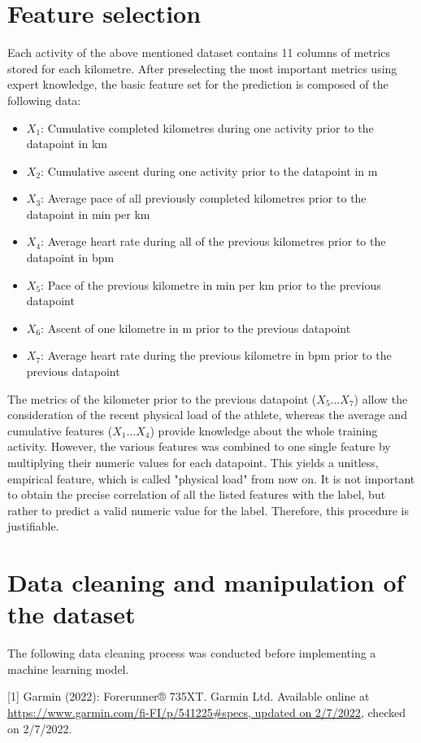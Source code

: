 \documentclass[11pt]{article}
\begin{document}
\section{Feature selection}
Each activity of the above mentioned dataset contains 11 columns of metrics stored for each kilometre. After preselecting the most important metrics using expert knowledge, the basic feature set for the prediction is composed of the following data:
\begin{itemize}
  \itemsep0pt
  \item ${X_1}$: Cumulative completed kilometres during one activity prior to the datapoint in km
  \item ${X_2}$: Cumulative ascent during one activity prior to the datapoint in m
  \item ${X_3}$: Average pace of all previously completed kilometres prior to the datapoint in min per km
  \item ${X_4}$: Average heart rate during all of the previous kilometres prior to the datapoint in bpm
  \item ${X_5}$: Pace of the previous kilometre in min per km prior to the previous datapoint
  \item ${X_6}$: Ascent of one kilometre in m prior to the previous datapoint
  \item ${X_7}$: Average heart rate during the previous kilometre in bpm  prior to the previous datapoint
\end{itemize}

The metrics of the kilometer prior to the previous datapoint ($X_5 ... X_7$) allow the consideration of the recent physical load of the athlete, whereas the average and cumulative features ($X_1 ... X_4$) provide knowledge about the whole training activity.
However, the various features was combined to one single feature by multiplying their numeric values for each datapoint. This yields a unitless, empirical feature, which is called "physical load" from now on.  It is not important to obtain the precise correlation of all the listed features with the label, but rather to predict a valid numeric value for the label. Therefore, this procedure is justifiable.\\


\section{Data cleaning and manipulation of the dataset}
The following  data cleaning process was conducted before implementing a machine learning model.


[1]	Garmin (2022): Forerunner® 735XT. Garmin Ltd. Available online at    			\url{https://www.garmin.com/fi-FI/p/541225#specs, updated on 2/7/2022}, checked on 2/7/2022.
\end{document}

